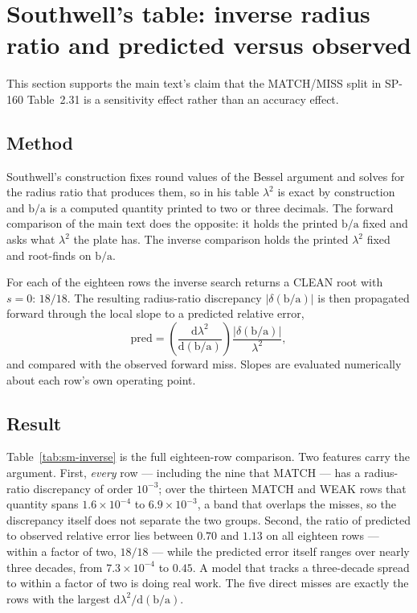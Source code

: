 \documentclass[11pt]{article}
\newcommand{\lamsq}{\lambda^{2}}
\newcommand{\ba}{\mbox{b/a}}
\begin{document}
\section{Southwell's table: inverse radius ratio and predicted
versus observed}\label{sec:sm-inverse}
This section supports the main text's claim that the MATCH/MISS split in
SP-160 Table~2.31 is a sensitivity effect rather than an accuracy effect.

\subsection{Method}\label{sec:sm-inv-method}
Southwell's construction fixes round values of the Bessel argument and solves
for the radius ratio that produces them, so in his table $\lamsq$ is exact by
construction and $\ba$ is a computed quantity printed to two or three
decimals. The forward comparison of the main text does the opposite: it holds
the printed $\ba$ fixed and asks what $\lamsq$ the plate has. The inverse
comparison holds the printed $\lamsq$ fixed and root-finds on $\ba$.

For each of the eighteen rows the inverse search returns a CLEAN root with
$s=0$: $18/18$. The resulting radius-ratio discrepancy $|\delta(\ba)|$ is then
propagated forward through the local slope to a predicted relative error,
\begin{equation}
\mathrm{pred} =
\left(\frac{\mathrm{d}\lamsq}{\mathrm{d}(\ba)}\right)
\frac{|\delta(\ba)|}{\lamsq},
\label{eq:sm-pred}
\end{equation}
and compared with the observed forward miss. Slopes are evaluated numerically
about each row's own operating point.

\subsection{Result}\label{sec:sm-inv-result}
Table~\ref{tab:sm-inverse} is the full eighteen-row comparison. Two features
carry the argument. First, \emph{every} row --- including the nine that MATCH
--- has a radius-ratio discrepancy of order $10^{-3}$; over the thirteen
MATCH and WEAK rows that quantity spans $1.6\times10^{-4}$ to
$6.9\times10^{-3}$, a band that overlaps the misses, so the discrepancy itself
does not separate the two groups. Second, the ratio of predicted to observed
relative error lies between $0.70$ and $1.13$ on all eighteen rows --- within
a factor of two, $18/18$ --- while the predicted error itself ranges over
nearly three decades, from $7.3\times10^{-4}$ to $0.45$. A model that tracks
a three-decade spread to within a factor of two is doing real work. The five
direct misses are exactly the rows with the largest
$\mathrm{d}\lamsq/\mathrm{d}(\ba)$.
\end{document}
